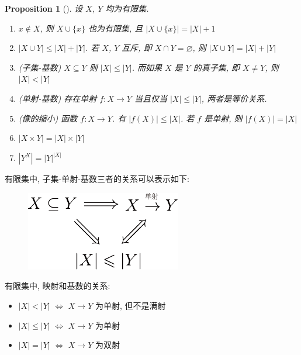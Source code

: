 \documentclass[UTF8]{ctexart}
\theoremstyle{mystyle}
\newtheorem{proposition}{Proposition}[section]
\theoremstyle{myremark}
\theoremstyle{plain}
\newcommand{\set}[1]{\{#1\}}
\begin{document}
\begin{proposition}[] \label{cardinal}
    设 $ X $, $ Y $ 均为有限集.
    \begin{enumerate}
        \item $ x \notin X $, 则 $ X \cup \set{x} $ 也为有限集, 且 $ |X \cup \set{x}| = |X| + 1 $
        \item $ |X \cup Y| \leqslant |X| + |Y| $. 若 $ X $, $ Y $ 互斥, 即 $ X \cap Y = \varnothing $, 则 $ |X \cup Y| = |X| + |Y| $
        \item (子集-基数) $ X \subseteq Y $ 则 $ |X| \leqslant |Y| $. 而如果 $ X $ 是 $ Y $ 的真子集, 即 $ X \neq Y $, 则 $ |X| < |Y| $
        \item (单射-基数) 存在单射 $ f\colon X \to Y $ 当且仅当 $ |X| \leqslant |Y| $, 两者是等价关系.
        \item (像的缩小) 函数 $ f \colon X \to Y $. 有 $ |f(X)| \leqslant |X| $. 若 $ f $ 是单射, 则 $ |f(X)| = |X| $
        \item $ |X \times Y| = |X| \times |Y| $
        \item $ |Y^X| = |Y|^{|X|} $
    \end{enumerate}
\end{proposition}

有限集中, 子集-单射-基数三者的关系可以表示如下:
\begin{figure}[H]
    \centering
    \includegraphics[width = 0.35\linewidth]{./images/implies.pdf}
\end{figure}

有限集中, 映射和基数的关系:
\begin{itemize}
    \item $ |X| < |Y| $ $ \Longleftrightarrow $ $ X \to Y $ 为单射, 但不是满射
    \item $ |X| \leqslant |Y| $ $ \Longleftrightarrow $ $ X \to Y $ 为单射
    \item $ |X| = |Y| $ $ \Longleftrightarrow $ $ X \to Y $ 为双射
\end{itemize}
\end{document}
